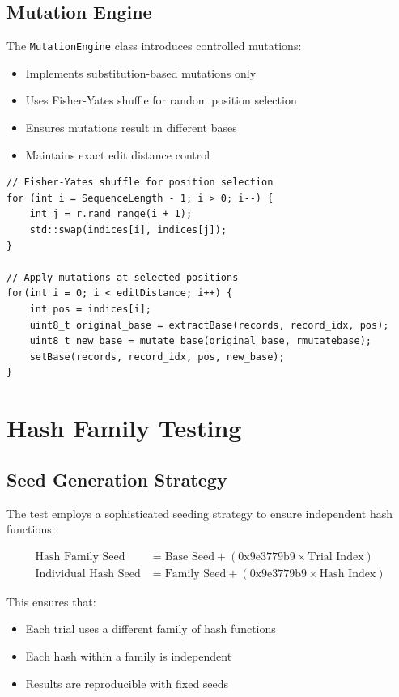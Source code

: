 \documentclass[11pt,a4paper]{article}
\begin{document}
\subsection{Mutation Engine}

The \texttt{MutationEngine} class introduces controlled mutations:

\begin{itemize}
    \item Implements substitution-based mutations only
    \item Uses Fisher-Yates shuffle for random position selection
    \item Ensures mutations result in different bases
    \item Maintains exact edit distance control
\end{itemize}

\begin{lstlisting}[caption=Mutation Algorithm]
// Fisher-Yates shuffle for position selection
for (int i = SequenceLength - 1; i > 0; i--) {
    int j = r.rand_range(i + 1);
    std::swap(indices[i], indices[j]);
}

// Apply mutations at selected positions
for(int i = 0; i < editDistance; i++) {
    int pos = indices[i];
    uint8_t original_base = extractBase(records, record_idx, pos);
    uint8_t new_base = mutate_base(original_base, rmutatebase);
    setBase(records, record_idx, pos, new_base);
}
\end{lstlisting}

\section{Hash Family Testing}

\subsection{Seed Generation Strategy}

The test employs a sophisticated seeding strategy to ensure independent hash functions:

\begin{align}
\text{Hash Family Seed} &= \text{Base Seed} + (0\text{x}9\text{e}3779\text{b}9 \times \text{Trial Index}) \\
\text{Individual Hash Seed} &= \text{Family Seed} + (0\text{x}9\text{e}3779\text{b}9 \times \text{Hash Index})
\end{align}

This ensures that:
\begin{itemize}
    \item Each trial uses a different family of hash functions
    \item Each hash within a family is independent
    \item Results are reproducible with fixed seeds
\end{itemize}
\end{document}
